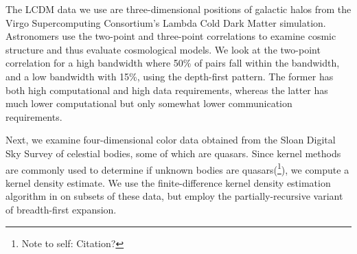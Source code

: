 \documentclass[twoside,leqno,twocolumn]{article}
\newcommand{\authornote}[1]{(\footnote{Note to self: #1})}
\newcommand{\authorsnote}[1]{\authornote{#1}}
\begin{document}

%
%
%

The LCDM data we use are three-dimensional positions of galactic halos from the Virgo Supercomputing Consortium's Lambda Cold Dark Matter simulation.
Astronomers use the two-point and three-point correlations to examine cosmic structure and thus evaluate cosmological models.
We look at the two-point correlation for a high bandwidth where 50\% of pairs fall within the bandwidth, and a low bandwidth with 15\%, using the depth-first pattern.
The former has both high computational and high data requirements, whereas the latter has much lower computational but only somewhat lower communication requirements.

Next, we examine four-dimensional color data obtained from the Sloan Digital Sky Survey of celestial bodies, some of which are quasars.
Since kernel methods are commonly used to determine if unknown bodies are quasars\authorsnote{Citation?}, we compute a kernel density estimate.
We use the finite-difference kernel density estimation algorithm in \cite{gray_kde} on subsets of these data, but employ the partially-recursive variant of breadth-first expansion.
\end{document}
